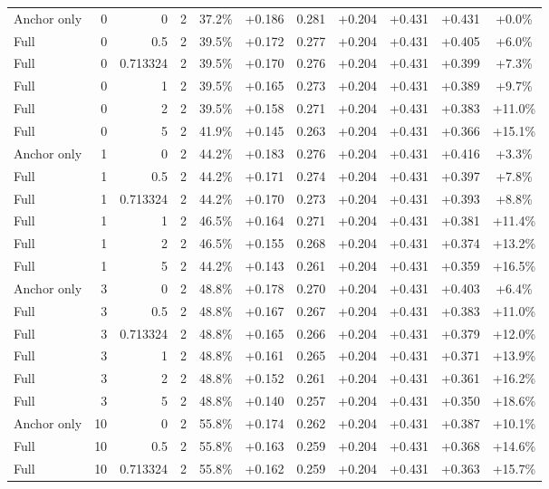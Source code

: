 \begin{table}[htbp]
\begin{tabular}{lrrrccccccc}
Anchor only & 0 & 0 & 2 & 37.2\% & +0.186 & 0.281 & +0.204 & +0.431 & +0.431 & +0.0\% \\
Full & 0 & 0.5 & 2 & 39.5\% & +0.172 & 0.277 & +0.204 & +0.431 & +0.405 & +6.0\% \\
Full & 0 & 0.713324 & 2 & 39.5\% & +0.170 & 0.276 & +0.204 & +0.431 & +0.399 & +7.3\% \\
Full & 0 & 1 & 2 & 39.5\% & +0.165 & 0.273 & +0.204 & +0.431 & +0.389 & +9.7\% \\
Full & 0 & 2 & 2 & 39.5\% & +0.158 & 0.271 & +0.204 & +0.431 & +0.383 & +11.0\% \\
Full & 0 & 5 & 2 & 41.9\% & +0.145 & 0.263 & +0.204 & +0.431 & +0.366 & +15.1\% \\
Anchor only & 1 & 0 & 2 & 44.2\% & +0.183 & 0.276 & +0.204 & +0.431 & +0.416 & +3.3\% \\
Full & 1 & 0.5 & 2 & 44.2\% & +0.171 & 0.274 & +0.204 & +0.431 & +0.397 & +7.8\% \\
Full & 1 & 0.713324 & 2 & 44.2\% & +0.170 & 0.273 & +0.204 & +0.431 & +0.393 & +8.8\% \\
Full & 1 & 1 & 2 & 46.5\% & +0.164 & 0.271 & +0.204 & +0.431 & +0.381 & +11.4\% \\
Full & 1 & 2 & 2 & 46.5\% & +0.155 & 0.268 & +0.204 & +0.431 & +0.374 & +13.2\% \\
Full & 1 & 5 & 2 & 44.2\% & +0.143 & 0.261 & +0.204 & +0.431 & +0.359 & +16.5\% \\
Anchor only & 3 & 0 & 2 & 48.8\% & +0.178 & 0.270 & +0.204 & +0.431 & +0.403 & +6.4\% \\
Full & 3 & 0.5 & 2 & 48.8\% & +0.167 & 0.267 & +0.204 & +0.431 & +0.383 & +11.0\% \\
Full & 3 & 0.713324 & 2 & 48.8\% & +0.165 & 0.266 & +0.204 & +0.431 & +0.379 & +12.0\% \\
Full & 3 & 1 & 2 & 48.8\% & +0.161 & 0.265 & +0.204 & +0.431 & +0.371 & +13.9\% \\
Full & 3 & 2 & 2 & 48.8\% & +0.152 & 0.261 & +0.204 & +0.431 & +0.361 & +16.2\% \\
Full & 3 & 5 & 2 & 48.8\% & +0.140 & 0.257 & +0.204 & +0.431 & +0.350 & +18.6\% \\
Anchor only & 10 & 0 & 2 & 55.8\% & +0.174 & 0.262 & +0.204 & +0.431 & +0.387 & +10.1\% \\
Full & 10 & 0.5 & 2 & 55.8\% & +0.163 & 0.259 & +0.204 & +0.431 & +0.368 & +14.6\% \\
Full & 10 & 0.713324 & 2 & 55.8\% & +0.162 & 0.259 & +0.204 & +0.431 & +0.363 & +15.7\% \\

\end{tabular}
\end{table}
